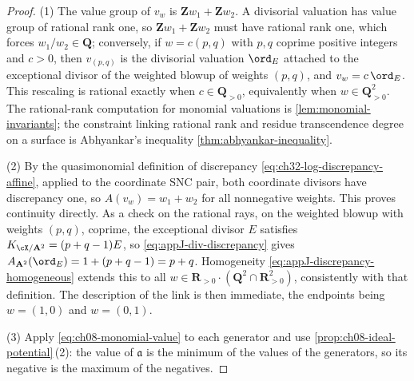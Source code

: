 \begin{proof}
(1)  The value group of $v_w$ is $\mathbf Z w_1+\mathbf Z w_2$.  A divisorial
valuation has value group of rational rank one, so
$\mathbf Zw_1+\mathbf Zw_2$ must have rational rank one, which forces
$w_1/w_2\in\mathbf Q$; conversely, if $w=c(p,q)$ with $p,q$ coprime positive
integers and $c>0$, then $v_{(p,q)}$ is the divisorial valuation
$\ord_E$ attached to the exceptional divisor of the weighted blowup of
weights $(p,q)$, and $v_w=c\,\ord_E$.  This rescaling is rational exactly
when $c\in\mathbf Q_{>0}$, equivalently when
$w\in\mathbf Q_{>0}^2$.  The rational-rank computation for
monomial valuations is \cref{lem:monomial-invariants}; the constraint linking
rational rank and residue transcendence degree on a surface is Abhyankar's
inequality \cref{thm:abhyankar-inequality}.

(2)  By the quasimonomial definition of discrepancy
\eqref{eq:ch32-log-discrepancy-affine}, applied to the coordinate SNC pair,
both coordinate divisors have discrepancy one, so
$A(v_w)=w_1+w_2$ for all nonnegative weights.  This proves continuity
directly.  As a check on the rational rays, on the weighted blowup with
weights $(p,q)$, coprime, the exceptional
divisor $E$ satisfies $K_{\cX/\mathbf A^2}=(p+q-1)E$, so
\eqref{eq:appJ-div-discrepancy} gives
$A_{\mathbf A^2}(\ord_E)=1+(p+q-1)=p+q$.  Homogeneity
\eqref{eq:appJ-discrepancy-homogeneous} extends this to all
$w\in\mathbf R_{>0}\cdot(\mathbf Q^2\cap\mathbf R^2_{>0})$, consistently
with that definition.  The description of the link is then immediate, the
endpoints being $w=(1,0)$ and $w=(0,1)$.

(3)  Apply \eqref{eq:ch08-monomial-value} to each generator and use
\cref{prop:ch08-ideal-potential}\,(2): the value of $\mathfrak a$ is the
minimum of the values of the generators, so its negative is the maximum of
the negatives.
\end{proof}

